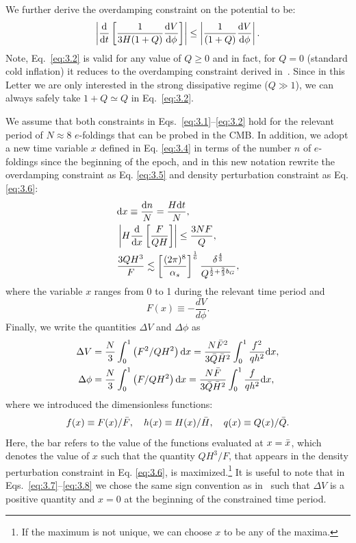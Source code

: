 \documentclass[aps,prd,twocolumn,amssymb,amsmath,floatfix,nofootinbib,superscriptaddress,preprintnumbers]{revtex4-1}
\begin{document}
We further derive the overdamping constraint on the potential to be:
\begin{equation}
    \left|\frac{{\rm d}}{{\rm d} t}\left[\frac{1}{3 H(1+Q)} \frac{{\rm d} V}{{\rm d} \phi}\right]\right| \leq\left|\frac{1}{(1+Q)}\frac{{\rm d} V}{{\rm d} \phi}\right|. \label{eq:3.2}
\end{equation}
Note, Eq.~\ref{eq:3.2} is valid for any value of $Q\geq 0$ and in fact, for $Q=0$ (standard cold inflation) it reduces to the overdamping constraint derived in~\cite{Adams:1990pn}. Since in this Letter we are only interested in the strong dissipative regime ($Q\gg1$), we can always safely take $1+Q\simeq Q$ in Eq.~\ref{eq:3.2}. 

We assume that both constraints in Eqs.~\ref{eq:3.1}--\ref{eq:3.2} hold for the relevant period of $N\approx8$ $e$-foldings that can be probed in the CMB. In addition, we adopt a new time variable $x$ defined in Eq. {\ref{eq:3.4}} in terms of the number $n$ of $e$-foldings since the beginning of the epoch,
and in this new notation rewrite the overdamping 
constraint  as Eq. {\ref{eq:3.5}}
and density perturbation constraint as Eq. {\ref{eq:3.6}}:
\begin{align}
    &{\rm d}x\equiv \frac{{\rm d}n}{N}=\frac{H{\rm d}t}{N}, \label{eq:3.4} \\
    &\left|H \frac{{\rm d}}{{\rm d} x}\left[\frac{F}{QH}\right]\right| \leq \frac{3 N F}{Q}, \label{eq:3.5} \\
    &\frac{3QH^3}{F}\lesssim \left[\frac{(2\pi)^8}{\alpha_s}\right]^{\frac{1}{6}}\frac{\delta^{\frac{4}{3}}}{Q^{\frac{1}{2}+\frac{2}{3}b_G}}, \label{eq:3.6}
\end{align}
where the variable $x$ ranges from 0 to 1 during the
relevant time period and
\begin{equation}
 F(x)\equiv -\frac{dV}{d\phi}. 
\end{equation}
 Finally, we write the quantities $\Delta V$ and $\Delta \phi$ as
\begin{align}
    \Delta V&=\frac{N}{3} \int_{0}^{1}\left(F^{2} / QH^{2}\right) {\rm d} x=\frac{N\Bar{F}^2}{3\Bar{Q}\Bar{H}^2}\int^1_0\frac{f^2}{qh^2}{\rm d} x, \label{eq:3.7}\\
    \Delta \phi&=\frac{N}{3} \int_{0}^{1}\left(F / QH^{2}\right) {\rm d} x =\frac{N\bar{F}}{3\Bar{Q}\Bar{H}^2}\int^1_0\frac{f}{qh^2}{\rm d} x, \label{eq:3.8}
\end{align}
where we introduced the dimensionless functions:
\begin{equation}
    f(x)\equiv F(x)/\Bar{F}, \quad h(x)\equiv H(x)/\Bar{H}, \quad q(x)\equiv Q(x)/\Bar{Q}. \label{eq:3.9}
\end{equation}
Here, the bar refers to the value of the functions evaluated at $x=\Bar{x}$, which denotes the value of $x$ such that the quantity $QH^3/F$, that appears in the density perturbation constraint in Eq. {\ref{eq:3.6}}, is maximized.\footnote{If the maximum is not unique, we can choose $x$ to be any of the maxima.} It is useful to note that in Eqs.~\ref{eq:3.7}--\ref{eq:3.8} we chose the same sign convention as in~\cite{Adams:1990pn} such that $\Delta V$ is a positive quantity and $x=0$ at the beginning of the constrained time period.
\end{document}
